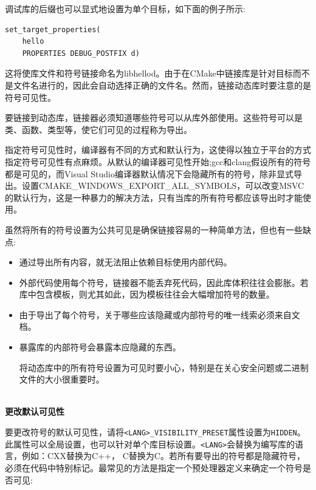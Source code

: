 调试库的后缀也可以显式地设置为单个目标，如下面的例子所示:

\begin{lstlisting}[style=styleCMake]
set_target_properties(
	hello
	PROPERTIES DEBUG_POSTFIX d)
\end{lstlisting}

这将使库文件和符号链接命名为libhellod。由于在CMake中链接库是针对目标而不是文件名进行的，因此会自动选择正确的文件名。然而，链接动态库时要注意的是符号可见性。


要链接到动态库，链接器必须知道哪些符号可以从库外部使用。这些符号可以是类、函数、类型等，使它们可见的过程称为导出。

指定符号可见性时，编译器有不同的方式和默认行为，这使得以独立于平台的方式指定符号可见性有点麻烦。从默认的编译器可见性开始;gcc和clang假设所有的符号都是可见的，而Visual Studio编译器默认情况下会隐藏所有的符号，除非显式导出。设置CMAKE\_WINDOWS\_EXPORT\_ALL\_SYMBOLS，可以改变MSVC的默认行为，这是一种暴力的解决方法，只有当库的所有符号都应该导出时才能使用。

虽然将所有的符号设置为公共可见是确保链接容易的一种简单方法，但也有一些缺点:

\begin{itemize}
\item 
通过导出所有内容，就无法阻止依赖目标使用内部代码。

\item 
外部代码使用每个符号，链接器不能丢弃死代码，因此库体积往往会膨胀。若库中包含模板，则尤其如此，因为模板往往会大幅增加符号的数量。

\item 
由于导出了每个符号，关于哪些应该隐藏或内部符号的唯一线索必须来自文档。

\item 
暴露库的内部符号会暴露本应隐藏的东西。

\begin{tcolorbox}[colback=blue!5!white,colframe=blue!75!black,title=所有符号可见]
将动态库中的所有符号设置为可见时要小心，特别是在关心安全问题或二进制文件的大小很重要时。
\end{tcolorbox}
\end{itemize}

\hspace*{\fill} \\ %
\noindent
\textbf{更改默认可见性}

要更改符号的默认可见性，请将\texttt{<LANG>\_VISIBILITY\_PRESET}属性设置为\texttt{HIDDEN}。此属性可以全局设置，也可以针对单个库目标设置。\texttt{<LANG>}会替换为编写库的语言，例如：CXX替换为C++， C替换为C。若所有要导出的符号都是隐藏符号，必须在代码中特别标记。最常见的方法是指定一个预处理器定义来确定一个符号是否可见:

